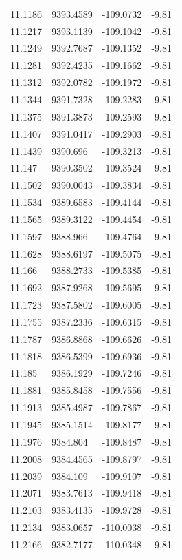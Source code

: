\begin{table}[H]
\begin{tabular}{llll}
11.1186 & 9393.4589 & -109.0732 & -9.81 \\
11.1217 & 9393.1139 & -109.1042 & -9.81 \\
11.1249 & 9392.7687 & -109.1352 & -9.81 \\
11.1281 & 9392.4235 & -109.1662 & -9.81 \\
11.1312 & 9392.0782 & -109.1972 & -9.81 \\
11.1344 & 9391.7328 & -109.2283 & -9.81 \\
11.1375 & 9391.3873 & -109.2593 & -9.81 \\
11.1407 & 9391.0417 & -109.2903 & -9.81 \\
11.1439 & 9390.696 & -109.3213 & -9.81 \\
11.147 & 9390.3502 & -109.3524 & -9.81 \\
11.1502 & 9390.0043 & -109.3834 & -9.81 \\
11.1534 & 9389.6583 & -109.4144 & -9.81 \\
11.1565 & 9389.3122 & -109.4454 & -9.81 \\
11.1597 & 9388.966 & -109.4764 & -9.81 \\
11.1628 & 9388.6197 & -109.5075 & -9.81 \\
11.166 & 9388.2733 & -109.5385 & -9.81 \\
11.1692 & 9387.9268 & -109.5695 & -9.81 \\
11.1723 & 9387.5802 & -109.6005 & -9.81 \\
11.1755 & 9387.2336 & -109.6315 & -9.81 \\
11.1787 & 9386.8868 & -109.6626 & -9.81 \\
11.1818 & 9386.5399 & -109.6936 & -9.81 \\
11.185 & 9386.1929 & -109.7246 & -9.81 \\
11.1881 & 9385.8458 & -109.7556 & -9.81 \\
11.1913 & 9385.4987 & -109.7867 & -9.81 \\
11.1945 & 9385.1514 & -109.8177 & -9.81 \\
11.1976 & 9384.804 & -109.8487 & -9.81 \\
11.2008 & 9384.4565 & -109.8797 & -9.81 \\
11.2039 & 9384.109 & -109.9107 & -9.81 \\
11.2071 & 9383.7613 & -109.9418 & -9.81 \\
11.2103 & 9383.4135 & -109.9728 & -9.81 \\
11.2134 & 9383.0657 & -110.0038 & -9.81 \\
11.2166 & 9382.7177 & -110.0348 & -9.81 \\

\end{tabular}
\end{table}
